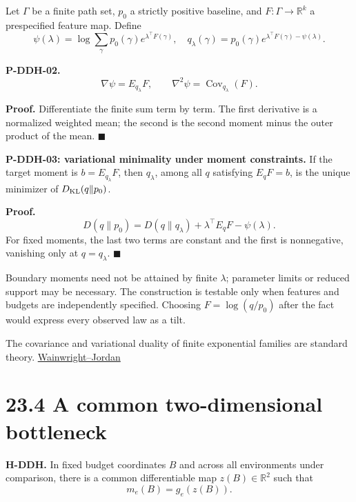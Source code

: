 \documentclass[
  english,
  11pt,
  oneside]{book}
\begin{document}
Let \(\Gamma\) be a finite path set, \(p_0\) a strictly positive baseline, and \(F:\Gamma\to\mathbb R^k\) a prespecified feature map. Define \[\psi(\lambda)=\log\sum_\gamma p_0(\gamma)e^{\lambda^\top F(\gamma)},
\quad
q_\lambda(\gamma)=p_0(\gamma)e^{\lambda^\top F(\gamma)-\psi(\lambda)}.\]

\hypertarget{p-ddh-02}{}\label{p-ddh-02}

\textbf{P-DDH-02.} \[\nabla\psi=E_{q_\lambda}F,\qquad
\nabla^2\psi=\operatorname{Cov}_{q_\lambda}(F).\]

\textbf{Proof.} Differentiate the finite sum term by term. The first derivative is a normalized weighted mean; the second is the second moment minus the outer product of the mean. \(\blacksquare\)

\hypertarget{p-ddh-03}{}\label{p-ddh-03}

\textbf{P-DDH-03: variational minimality under moment constraints.} If the target moment is \(b=E_{q_\lambda}F\), then \(q_\lambda\), among all \(q\) satisfying \(E_qF=b\), is the unique minimizer of \(D_{\rm KL}(q\|p_0)\).

\textbf{Proof.} \[D(q\|p_0)=D(q\|q_\lambda)+\lambda^\top E_qF-\psi(\lambda).\] For fixed moments, the last two terms are constant and the first is nonnegative, vanishing only at \(q=q_\lambda\). \(\blacksquare\)

Boundary moments need not be attained by finite \(\lambda\); parameter limits or reduced support may be necessary. The construction is testable only when features and budgets are independently specified. Choosing \(F=\log(q/p_0)\) after the fact would express every observed law as a tilt.

The covariance and variational duality of finite exponential families are standard theory. \href{https://www.emerald.com/ftmal/article/1/1-2/1/1332382/Graphical-Models-Exponential-Families-and}{Wainwright--Jordan}

\section{23.4 A common two-dimensional bottleneck}\label{a-common-two-dimensional-bottleneck}

\textbf{H-DDH.} In fixed budget coordinates \(B\) and across all environments under comparison, there is a common differentiable map \(z(B)\in\mathbb R^2\) such that \[m_e(B)=g_e(z(B)).\]

\hypertarget{p-ddh-04}{}\label{p-ddh-04}
\end{document}
